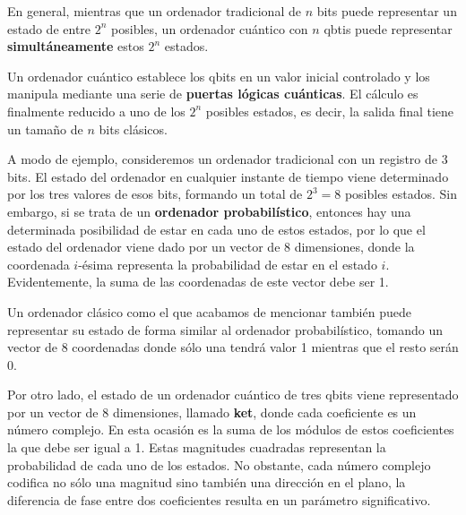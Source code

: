\documentclass[nochap]{apuntesURJC}
\begin{document}
En general, mientras que un ordenador tradicional de $n$ bits puede representar un estado de entre $2^n$ posibles, un ordenador cuántico con $n$ qbtis puede representar \textbf{simultáneamente} estos $2^n$ estados.

Un ordenador cuántico establece los qbits en un valor inicial controlado y los manipula mediante una serie de \textbf{puertas lógicas cuánticas}. El cálculo es finalmente reducido a uno de los $2^n$ posibles estados, es decir, la salida final tiene un tamaño de $n$ bits clásicos.

A modo de ejemplo, consideremos un ordenador tradicional con un registro de 3 bits. El estado del ordenador en cualquier instante de tiempo viene determinado por los tres valores de esos bits, formando un total de $2^3=8$ posibles estados. Sin embargo, si se trata de un \textbf{ordenador probabilístico}, entonces hay una determinada posibilidad de estar en cada uno de estos estados, por lo que el estado del ordenador viene dado por un vector de 8 dimensiones, donde la coordenada $i$-ésima representa la probabilidad de estar en el estado $i$. Evidentemente, la suma de las coordenadas de este vector debe ser 1.

Un ordenador clásico como el que acabamos de mencionar también puede representar su estado de forma similar al ordenador probabilístico, tomando un vector de 8 coordenadas donde sólo una tendrá valor 1 mientras que el resto serán 0.

Por otro lado, el estado de un ordenador cuántico de tres qbits viene representado por un vector de 8 dimensiones, llamado \textbf{ket}, donde cada coeficiente es un número complejo. En esta ocasión es la suma de los módulos de estos coeficientes la que debe ser igual a 1. Estas magnitudes cuadradas representan la probabilidad de cada uno de los estados. No obstante, cada número complejo codifica no sólo una magnitud sino también una dirección en el plano, la diferencia de fase entre dos coeficientes resulta en un parámetro significativo.

\newpage
\nocite{*}
\renewcommand{\refname}{\spacedlowsmallcaps{Bibliografía}} %



\end{document}
